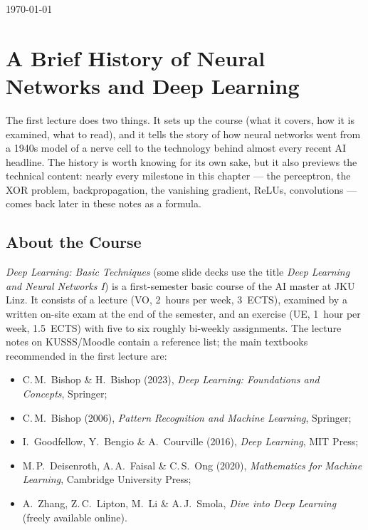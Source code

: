 \documentclass[11pt, oneside]{book}
\let\originalsection\section
\renewcommand{\section}{\Needspace{7\baselineskip}\originalsection}
\begin{document}
\vfill
{\centering\small\color{gray!65} \today\par}
\clearpage


\setcounter{tocdepth}{2}  %

\begingroup
  \let\cleardoublepage\relax
  \let\clearpage\relax
  \tableofcontents
\endgroup

\mainmatter  %


\chapter{A Brief History of Neural Networks and Deep Learning}
\label{ch:history}

The first lecture does two things. It sets up the course (what it covers,
how it is examined, what to read), and it tells the story of how neural
networks went from a 1940s model of a nerve cell to the technology behind
almost every recent AI headline. The history is worth knowing for its own
sake, but it also previews the technical content: nearly every milestone in
this chapter --- the perceptron, the XOR problem, backpropagation, the
vanishing gradient, ReLUs, convolutions --- comes back later in these notes
as a formula.

\section{About the Course}

\emph{Deep Learning: Basic Techniques} (some slide decks use the title
\emph{Deep Learning and Neural Networks I}) is a first-semester basic course
of the AI master at JKU Linz. It consists of a lecture (VO, 2~hours per week,
3~ECTS), examined by a written on-site exam at the end of the semester, and
an exercise (UE, 1~hour per week, 1.5~ECTS) with five to six roughly
bi-weekly assignments. The lecture notes on KUSSS/Moodle contain a reference
list; the main textbooks recommended in the first lecture are:
\begin{itemize}
  \item C.\,M.~Bishop \& H.~Bishop (2023), \emph{Deep Learning: Foundations
    and Concepts}, Springer;
  \item C.\,M.~Bishop (2006), \emph{Pattern Recognition and Machine
    Learning}, Springer;
  \item I.~Goodfellow, Y.~Bengio \& A.~Courville (2016), \emph{Deep
    Learning}, MIT Press;
  \item M.\,P.~Deisenroth, A.\,A.~Faisal \& C.\,S.~Ong (2020),
    \emph{Mathematics for Machine Learning}, Cambridge University Press;
  \item A.~Zhang, Z.\,C.~Lipton, M.~Li \& A.\,J.~Smola, \emph{Dive into Deep
    Learning} (freely available online).
\end{itemize}
\end{document}
